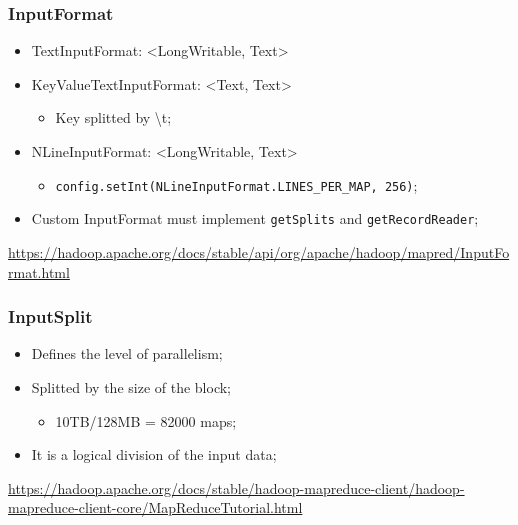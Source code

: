 \documentclass[aspectratio=169]{beamer}
\begin{document}
\begin{frame}
	\frametitle{InputFormat}

	\begin{itemize}
		\item TextInputFormat: <LongWritable, Text>
		\item KeyValueTextInputFormat: <Text, Text>
		      \begin{itemize}
			      \item Key splitted by \textbackslash t;
		      \end{itemize}
		\item NLineInputFormat: <LongWritable, Text>
		      \begin{itemize}
			      \item {\scriptsize \texttt{config.setInt(NLineInputFormat.LINES\_PER\_MAP, 256)}};
		      \end{itemize}
		\item Custom InputFormat must implement \texttt{getSplits} and \texttt{getRecordReader};
	\end{itemize}

	\begin{center}
		{\tiny \href{https://hadoop.apache.org/docs/stable/api/org/apache/hadoop/mapred/InputFormat.html}{https://hadoop.apache.org/docs/stable/api/org/apache/hadoop/mapred/InputFormat.html}}
	\end{center}
\end{frame}

\begin{frame}
	\frametitle{InputSplit}

	\begin{itemize}
		\item Defines the level of parallelism;
		\item Splitted by the size of the block;
		      \begin{itemize}
			      \item 10TB/128MB = 82000 maps;
		      \end{itemize}
		\item It is a logical division of the input data;
	\end{itemize}

	\begin{center}
		{\tiny \href{https://hadoop.apache.org/docs/stable/hadoop-mapreduce-client/hadoop-mapreduce-client-core/MapReduceTutorial.html}{https://hadoop.apache.org/docs/stable/hadoop-mapreduce-client/hadoop-mapreduce-client-core/MapReduceTutorial.html}}
	\end{center}
\end{frame}
\end{document}
